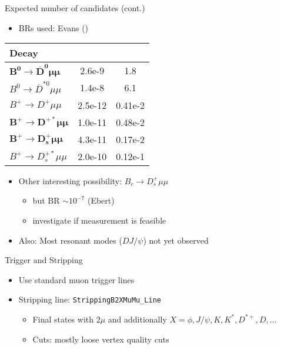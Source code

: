 \documentclass[compress,aspectratio=43]{beamer}
\begin{document}
\begin{frame}[shrink=20]{Expected number of candidates (cont.)}
  \begin{itemize}
    \item BRs used: Evans (\cite{evans1}\cite{evans2})
  \end{itemize}
  \centering
  \begin{tabular}{l S S}
    \toprule
    Decay & {} & {} \\
    \midrule
    $\mathbf{B^0\to \overline{D}^0\mu\mu}$ & 2.6e-9 & 1.8 \\
    $B^0\to \overline{D}^{*0}\mu\mu$ & 1.4e-8 & 6.1 \\
    $B^+\to D^+\mu\mu$ & 2.5e-12 & 0.41e-2 \\
    $\mathbf{B^+\to D^{+*}\mu\mu}$ & 1.0e-11 & 0.48e-2 \\
    $\mathbf{B^+\to D_s^+\mu\mu}$ & 4.3e-11 & 0.17e-2 \\
    $B^+\to D_s^{+*}\mu\mu$ & 2.0e-10 & 0.12e-1 \\
    \bottomrule
  \end{tabular}
  \begin{itemize}
    \item Other interesting possibility: $B_c \to D_s^+\mu\mu$
      \begin{itemize}
        \item but BR $\sim 10^{-7}$ (Ebert\cite{ebert})
        \item investigate if measurement is feasible
      \end{itemize}
    \item Also: Most resonant modes ($D J/\psi$) not yet observed
  \end{itemize}
\end{frame}

\begin{frame}{Trigger and Stripping}
  \begin{itemize}
    \item Use standard muon trigger lines
    \item Stripping line: \texttt{StrippingB2XMuMu\_Line}
      \begin{itemize}
        \item Final states with $2\mu$ and additionally $X=\phi,J/\psi,K,K^*,D^{*+},D,...$
        \item Cuts: mostly loose vertex quality cuts
      \end{itemize}
  \end{itemize}
\end{frame}
\end{document}
